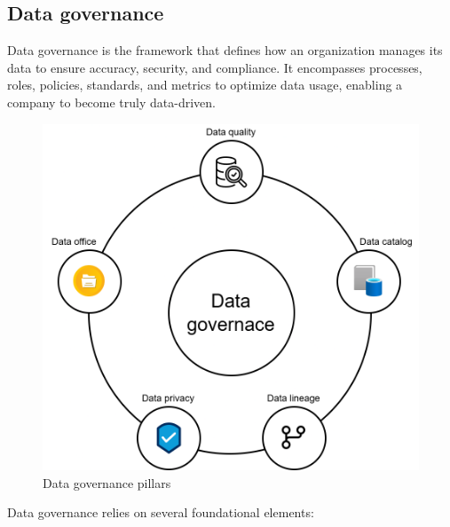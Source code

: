 \subsection{Data governance}
Data governance is the framework that defines how an organization manages its data to ensure accuracy, security, and compliance. 
It encompasses processes, roles, policies, standards, and metrics to optimize data usage, enabling a company to become truly data-driven.
\begin{figure}[H]
    \centering
    \includegraphics[width=0.5\linewidth]{images/bis12.png}
    \caption{Data governance pillars}
\end{figure}
Data governance relies on several foundational elements: 
